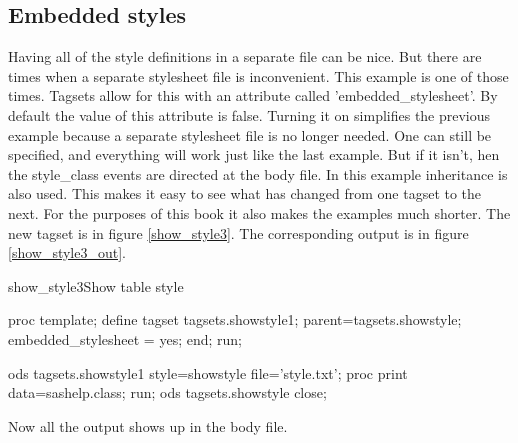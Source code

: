 \subsection{Embedded styles}
Having all of the style definitions in a separate file can be nice.
But there are times when a separate stylesheet file is inconvenient.
This example is one
of those times.  Tagsets allow for this with an attribute called 'embedded\_stylesheet'.
By default the value of this attribute is false.  Turning it on simplifies the
previous example because a separate stylesheet file is no longer needed.  One can
still be specified, and everything will work just like the last example.  But if it isn't,
 hen the style\_class events are directed at the body
file.  In this example inheritance is also used.  This
makes it easy to see what has changed from one tagset to the next.  
For the purposes of this book it also
makes the examples much shorter.  The new tagset is in figure 
\vref{show_style3}.  The corresponding output is
in figure \vref{show_style3_out}.

\begin{fvcode}{show_style3}{Show table style}

proc template;
    define tagset tagsets.showstyle1;
        parent=tagsets.showstyle;
        embedded_stylesheet = yes;
     end;
run;

ods tagsets.showstyle1 style=showstyle file='style.txt';
proc print data=sashelp.class; run;
ods tagsets.showstyle close;
\end{fvcode}
       
Now all the output shows up in the body file.



